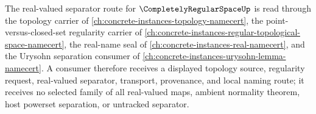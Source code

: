 The real-valued separator route for $\CompletelyRegularSpaceUp$ is read through the topology carrier of \autoref{ch:concrete-instances-topology-namecert}, the point-versus-closed-set regularity carrier of \autoref{ch:concrete-instances-regular-topological-space-namecert}, the real-name seal of \autoref{ch:concrete-instances-real-namecert}, and the Urysohn separation consumer of \autoref{ch:concrete-instances-urysohn-lemma-namecert}. A consumer therefore receives a displayed topology source, regularity request, real-valued separator, transport, provenance, and local naming route; it receives no selected family of all real-valued maps, ambient normality theorem, host powerset separation, or untracked separator.
